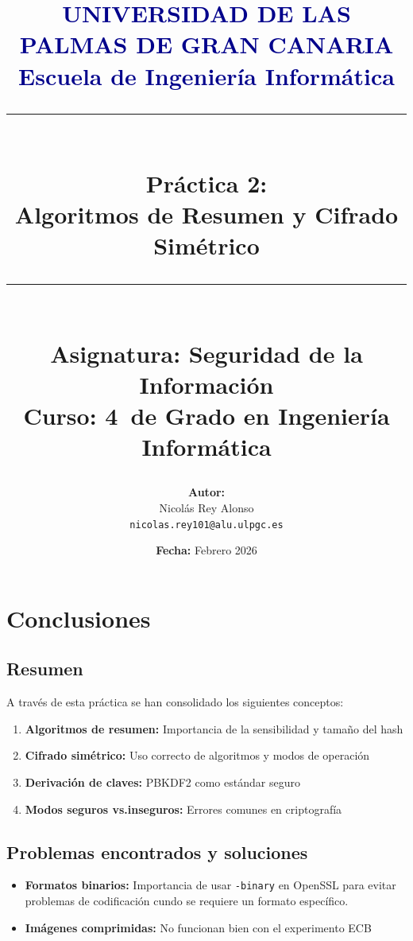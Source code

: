 \documentclass[12pt,a4paper]{report}
\title{
    \vspace*{-2cm}
    {\Large \textcolor{darkblue}{\textbf{UNIVERSIDAD DE LAS PALMAS DE GRAN CANARIA}}}\\
    {\Large \textcolor{darkblue}{\textbf{Escuela de Ingeniería Informática}}}\\
    \vspace{1cm}
    {\rule{\textwidth}{2pt}}\\
    \vspace{0.5cm}
    {\LARGE \textbf{Práctica 2:}}\\
    {\LARGE \textbf{Algoritmos de Resumen y Cifrado Simétrico}}\\
    \vspace{0.5cm}
    {\rule{\textwidth}{2pt}}\\
    \vspace{1cm}
    {\large \textbf{Asignatura:} Seguridad de la Información}\\
    {\large \textbf{Curso:} 4\textdegree\ de Grado en Ingeniería Informática}\\
    \vspace{1.5cm}
}
\author{
    \textbf{Autor:} \\
    Nicolás Rey Alonso\\
    \texttt{nicolas.rey101@alu.ulpgc.es}\\
}
\date{
    \vspace{1cm}
    \textbf{Fecha:} Febrero 2026
}
\begin{document}
\maketitle
\thispagestyle{firststyle}








\chapter{Conclusiones}

\section{Resumen}

A través de esta práctica se han consolidado los siguientes conceptos:

\begin{enumerate}
    \item \textbf{Algoritmos de resumen:} Importancia de la sensibilidad y tamaño del hash
    \item \textbf{Cifrado simétrico:} Uso correcto de algoritmos y modos de operación
    \item \textbf{Derivación de claves:} PBKDF2 como estándar seguro
    \item \textbf{Modos seguros vs.\@ inseguros:} Errores comunes en criptografía
\end{enumerate}

\section{Problemas encontrados y soluciones}

\begin{itemize}[label=\textbullet]
    \item \textbf{Formatos binarios:} Importancia de usar \texttt{-binary} en OpenSSL
     para evitar problemas de codificación cundo se requiere un formato específico.
    \item \textbf{Imágenes comprimidas:} No funcionan bien con el experimento ECB
\end{itemize}


\end{document}
